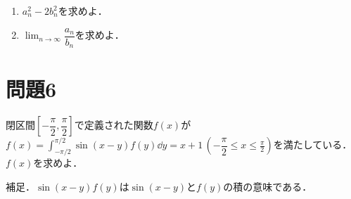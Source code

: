 \documentclass[unicode,12pt, A4j]{ltjsarticle}%
\begin{document}
\begin{enumerate}
 \item $a_n^2-2b_n^2$を求めよ．
 \item ${\displaystyle \lim_{n\to\infty}}\dfrac{a_n}{b_n}$を求めよ．
\end{enumerate}

\section{問題6}
閉区間$\left[-\dfrac{\pi}{2},\dfrac{\pi}{2}\right]$で定義された関数$f(x)$が${\displaystyle f(x)=\int_{-\pi/2}^{\pi/2}\sin (x-y)f(y)\dd y=x+1\, \left(-\dfrac{\pi}{2}\le x \le \frac{\pi}{2}\right)}$を満たしている．$f(x)$を求めよ．

補足．$\sin (x-y)f(y)$は$\sin (x-y)$と$f(y)$の積の意味である．
\end{document}
